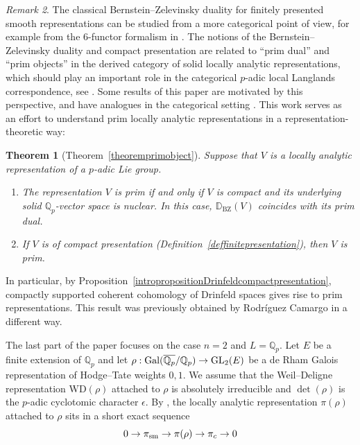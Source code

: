 \documentclass[a4paper,10pt]{amsart}
\newtheorem{theorem}{Theorem}[section]
\theoremstyle{remark}
\newtheorem{remark}[theorem]{Remark}
\theoremstyle{definition}
\theoremstyle{plain}
\numberwithin{equation}{section}
\newcommand{\bbD}{{\mathbb D}}
\newcommand{\bbQ}{{\mathbb Q}}
\newcommand{\Gal}{{\rm Gal}}
\newcommand{\GL}{{\rm GL}}
\newcommand{\sm}{{\rm sm}}
\newcommand{\BZ}{\ensuremath{\mathrm{BZ}}}
\begin{document}
\begin{remark}
	The classical Bernstein--Zelevinsky duality for finitely presented smooth representations can be studied from a more categorical point of view, for example from the $6$-functor formalism in \cite{heyer20246functor}. The notions of the Bernstein--Zelevinsky duality and compact presentation are related to ``prim dual'' and ``prim objects'' \cite[\S~4.4]{heyer20246functor} in the derived category of solid locally analytic representations, which should play an important role in the categorical $p$-adic local Langlands correspondence, see \cite[\S~6.2.1]{emerton2025introduction}. Some results of this paper are motivated by this perspective, and have analogues in the categorical setting \cite[Lem.~4.4.9, Lem.~4.4.19]{heyer20246functor}. This work serves as an effort to understand prim locally analytic representations in a representation-theoretic way:
	\begin{theorem}[{Theorem~\ref{theoremprimobject}}]
		Suppose that $V$ is a locally analytic representation of a $p$-adic Lie group. 
		\begin{enumerate}
			\item The representation $V$ is prim if and only if $V$ is compact and its underlying solid $\bbQ_p$-vector space is nuclear. In this case, $\bbD_{\BZ}(V)$ coincides with its prim dual.
			\item If $V$ is of compact presentation (Definition~\ref{deffinitepresentation}), then $V$ is prim.
		\end{enumerate}
	\end{theorem}
	In particular, by Proposition~\ref{intropropositionDrinfeldcompactpresentation}, compactly supported coherent cohomology of Drinfeld spaces gives rise to prim representations. This result was previously obtained by Rodríguez Camargo \cite[Rem.~6.2.56]{camargo2026locallyanalyticnotes} in a different way.
\end{remark}
The last part of the paper focuses on the case $n=2$ and $L=\bbQ_p$. Let $E$ be a finite extension of $\bbQ_p$ and let $\rho:\Gal(\overline{\bbQ_p}/\bbQ_p)\rightarrow \GL_2(E)$ be a de Rham Galois representation of Hodge--Tate weights $0,1$. We assume that the Weil--Deligne representation $\mathrm{WD}(\rho)$ attached to $\rho$ is absolutely irreducible and $\det(\rho)$ is the $p$-adic cyclotomic character $\epsilon$. By \cite{colmez2016representations,dospinescuLeBras2017revetements}, the locally analytic representation $\pi(\rho)$ attached to $\rho$ sits in a short exact sequence
\[0\rightarrow \pi_{\sm}\rightarrow \pi(\rho)\rightarrow \pi_c\rightarrow 0\]
\end{document}
